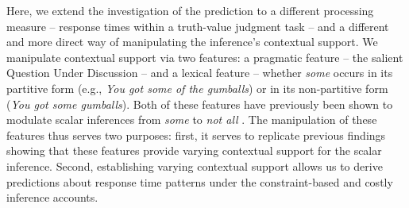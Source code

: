 \documentclass[10pt,letterpaper]{article}
\begin{document}
Here, we extend the investigation of the prediction to a different processing measure -- response times within a truth-value judgment task -- and a different and more direct way of manipulating the inference's contextual support. We manipulate contextual support via two features: a pragmatic feature -- the salient Question Under Discussion \cite<QUD, >{Roberts2012} -- and a lexical feature -- whether  \emph{some} occurs in its partitive form (e.g., \emph{You got some of the gumballs}) or in its non-partitive form (\emph{You got some gumballs}). Both of these features have previously been shown to modulate scalar inferences from \emph{some} to \emph{not all} \cite{Zondervan2010, DegenGoodman2014, Degen2015, DegenTanenhaus2015}. The manipulation of these features thus serves two purposes: first, it serves to replicate previous findings showing that these features provide varying contextual support for the scalar inference. Second, establishing varying contextual support allows us to derive predictions about response time patterns under the constraint-based and costly inference accounts.



\end{document}
